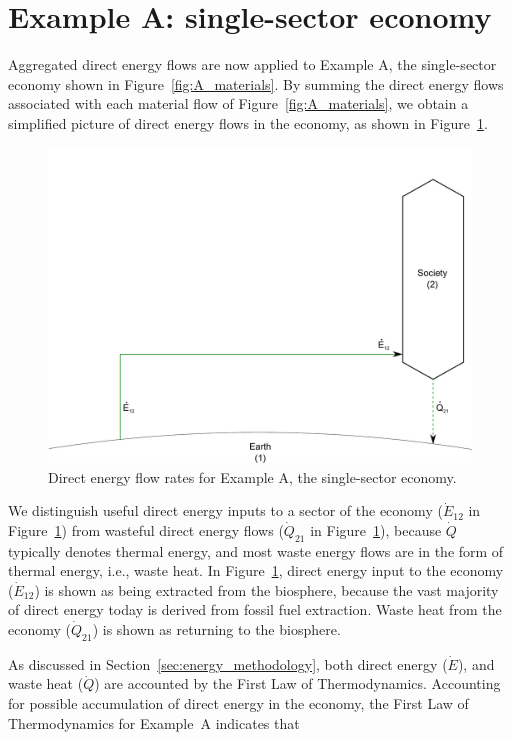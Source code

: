 \section{Example A: single-sector economy}

Aggregated direct energy flows are now applied to Example A, 
the single-sector economy shown in Figure~\ref{fig:A_materials}.
By summing the direct energy flows associated with
each material flow of Figure~\ref{fig:A_materials}, we obtain
a simplified picture of direct energy flows in the economy,
as shown in Figure~\ref{fig:A_energy}.

\begin{figure}[h!]
\centering
\includegraphics[width=0.8\linewidth]{Part_2/Chapter_Energy/images/1_sector_direct_energy.pdf}
\caption{Direct energy flow rates for Example A, the single-sector economy.}
\label{fig:A_energy}
\end{figure}

We distinguish useful direct energy inputs to a sector of the economy
($\dot{E}_{12}$ in Figure~\ref{fig:A_energy}) from wasteful direct energy flows 
($\dot{Q}_{21}$ in Figure~\ref{fig:A_energy}), 
because $\dot{Q}$ typically denotes thermal energy, 
and most waste energy flows are in the form of thermal
energy, i.e., waste heat. In Figure~\ref{fig:A_energy}, direct energy input to the 
economy ($\dot{E}_{12}$) is shown as being extracted from the biosphere, because
the vast majority of direct energy today is derived from fossil fuel extraction.
Waste heat from the economy ($\dot{Q}_{21}$) is shown as returning 
to the biosphere.

As discussed in Section~\ref{sec:energy_methodology}, 
both direct energy ($\dot{E}$), and waste heat ($\dot{Q}$) 
are accounted by the First Law of Thermodynamics. 
Accounting for possible accumulation of direct energy in the economy, 
the First Law of Thermodynamics for Example~A indicates that

